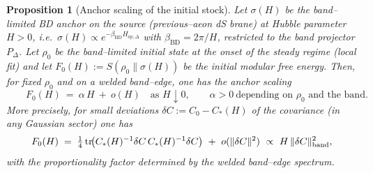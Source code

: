 \documentclass[10pt]{article}
\theoremstyle{definition}
\theoremstyle{plain}
\newtheorem{proposition}{Proposition}[section]
\begin{document}
\begin{proposition}[Anchor scaling of the initial stock]\label{prop:F0-H}
Let $\sigma(H)$ be the band–limited BD anchor on the source (previous–aeon dS brane) at Hubble parameter $H>0$,
i.e.\ $\sigma(H)\propto e^{-\beta_{\mathrm{BD}}H_{\mathrm{sp},\Delta}}$ with $\beta_{\mathrm{BD}}=2\pi/H$, restricted
to the band projector $P_\Delta$. Let $\rho_0$ be the band–limited initial state at the onset of the steady regime
(local fit) and let $F_0(H):=S(\rho_0\|\sigma(H))$ be the initial modular free energy. Then, for fixed $\rho_0$
and on a welded band–edge, one has the \emph{anchor scaling}
\begin{equation}\label{eq:F0-scaling}
\boxed{\qquad F_0(H)\ =\ \alpha\,H\ +\ o(H)\quad\text{as }H\downarrow 0,\qquad \alpha>0\ \text{depending on }\rho_0\text{ and the band.}\qquad}
\end{equation}
More precisely, for small deviations $\delta C:=C_0-C_\ast(H)$ of the covariance (in any Gaussian sector) one has
\begin{equation}\label{eq:F0-quadratic}
F_0(H)\;=\;\tfrac14\,\mathrm{tr}\!\big(C_\ast(H)^{-1}\delta C\,C_\ast(H)^{-1}\delta C\big)\ +\ o(\|\delta C\|^2)
\ \propto\ H\,\|\delta C\|_{\rm band}^2,
\end{equation}
with the proportionality factor determined by the welded band–edge spectrum.
\end{proposition}
\end{document}
